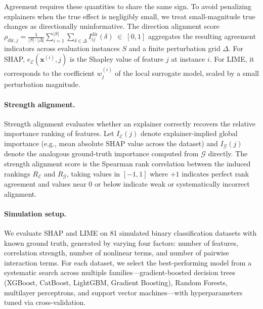 \documentclass[11pt]{article}
\begin{document}
Agreement requires these quantities to share the same sign. To avoid penalizing explainers when the true effect is negligibly small, we treat small-magnitude true changes as directionally uninformative. The direction alignment score $\rho_{\mathrm{dir},j} = \frac{1}{|S|\cdot|\Delta|} \sum_{i=1}^{|S|} \sum_{\delta \in \Delta} I^{\mathrm{dir}}_{ij}(\delta) \;\in\; [0,1]$ 
aggregates the resulting agreement indicators across evaluation instances $S$ and a finite perturbation grid $\Delta$. For SHAP, $e_{\mathcal{E}}(\mathbf{x}^{(i)}, j)$ is the Shapley value of feature $j$ at instance $i$. For LIME, it corresponds to the coefficient $w^{(i)}_j$ of the local surrogate model, scaled by a small perturbation magnitude.

\vspace{-0.5cm}
\paragraph{Strength alignment.}
Strength alignment evaluates whether an explainer correctly recovers the relative importance ranking of features. Let $I_{\mathcal{E}}(j)$ denote explainer-implied global importance (e.g., mean absolute SHAP value across the dataset) and $I_{\mathcal{G}}(j)$ denote the analogous ground-truth importance computed from $\mathcal{G}$ directly. The strength alignment score is the Spearman rank correlation between the induced rankings $R_{\mathcal{E}}$ and $R_{\mathcal{G}}$, 
taking values in $[-1,1]$ where $+1$ indicates perfect rank agreement and values near $0$ or below indicate weak or systematically incorrect alignment.
\vspace{-0.5cm}
\paragraph{Simulation setup.}
We evaluate SHAP and LIME on 81 simulated binary classification datasets with known ground truth, generated by varying four factors: number of features, correlation strength, number of nonlinear terms, and number of pairwise interaction terms. For each dataset, we select the best-performing model from a systematic search across multiple families---gradient-boosted decision trees (XGBoost, CatBoost, LightGBM, Gradient Boosting), Random Forests, multilayer perceptrons, and support vector machines---with hyperparameters tuned via cross-validation.
\vspace{-0.5cm}
\end{document}
